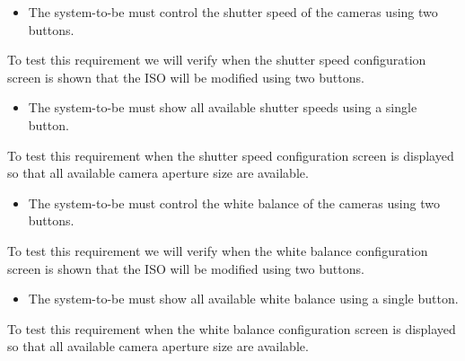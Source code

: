 \begin{itemize}
    \item The system-to-be must control the shutter speed of the cameras using two buttons.
\end{itemize}
To test this requirement we will verify when the shutter speed configuration screen is shown that the ISO will be modified using two buttons.
\begin{itemize}
    \item The system-to-be must show all available shutter speeds using a single button.
\end{itemize}
To test this requirement when the shutter speed configuration screen is displayed so that all available camera aperture size are available.
\begin{itemize}
    \item The system-to-be must control the white balance of the cameras using two buttons.
\end{itemize}
To test this requirement we will verify when the white balance configuration screen is shown that the ISO will be modified using two buttons.
\begin{itemize}
    \item The system-to-be must show all available white balance using a single button.
\end{itemize}
To test this requirement when the white balance configuration screen is displayed so that all available camera aperture size are available.
